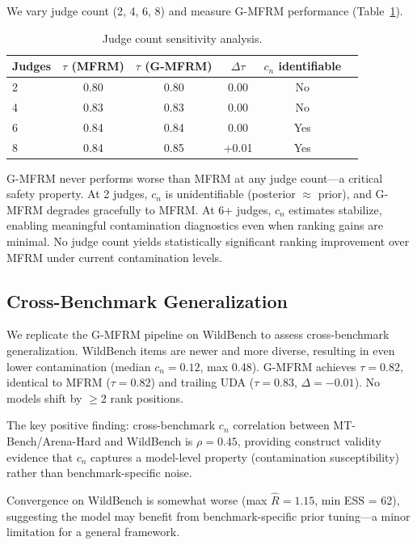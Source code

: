 \documentclass[11pt]{article}
\newcommand{\gmfrm}{G-MFRM}
\newcommand{\cn}{c_n}
\begin{document}
We vary judge count (2, 4, 6, 8) and measure \gmfrm{} performance (Table~\ref{tab:judge_count}).

\begin{table}[t]
\centering
\caption{Judge count sensitivity analysis.}
\label{tab:judge_count}
\small
\begin{tabular}{lccccc}
\toprule
Judges & $\tau$ (MFRM) & $\tau$ (\gmfrm{}) & $\Delta\tau$ & $\cn$ identifiable \\
\midrule
2 & 0.80 & 0.80 & 0.00 & No \\
4 & 0.83 & 0.83 & 0.00 & No \\
6 & 0.84 & 0.84 & 0.00 & Yes \\
8 & 0.84 & 0.85 & +0.01 & Yes \\
\bottomrule
\end{tabular}
\end{table}

\gmfrm{} never performs worse than MFRM at any judge count---a critical safety property. At 2 judges, $\cn$ is unidentifiable (posterior $\approx$ prior), and \gmfrm{} degrades gracefully to MFRM. At 6+ judges, $\cn$ estimates stabilize, enabling meaningful contamination diagnostics even when ranking gains are minimal. No judge count yields statistically significant ranking improvement over MFRM under current contamination levels.

\subsection{Cross-Benchmark Generalization}
\label{sec:wildbench}

We replicate the \gmfrm{} pipeline on WildBench to assess cross-benchmark generalization. WildBench items are newer and more diverse, resulting in even lower contamination (median $\cn = 0.12$, max 0.48). \gmfrm{} achieves $\tau = 0.82$, identical to MFRM ($\tau = 0.82$) and trailing UDA ($\tau = 0.83$, $\Delta = -0.01$). No models shift by $\geq$2 rank positions.

The key positive finding: cross-benchmark $\cn$ correlation between MT-Bench/Arena-Hard and WildBench is $\rho = 0.45$, providing construct validity evidence that $\cn$ captures a model-level property (contamination susceptibility) rather than benchmark-specific noise.

Convergence on WildBench is somewhat worse (max $\hat{R} = 1.15$, min ESS = 62), suggesting the model may benefit from benchmark-specific prior tuning---a minor limitation for a general framework.
\end{document}
